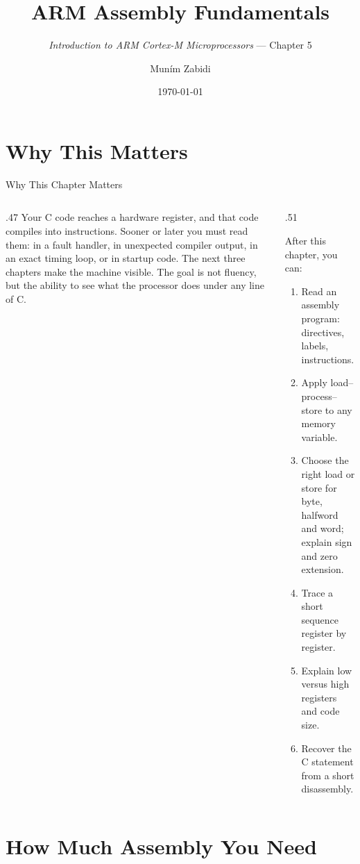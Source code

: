 \documentclass[9pt,aspectratio=169,xcolor=table]{beamer}
\title{ARM Assembly Fundamentals}
\subtitle{\emph{Introduction to ARM Cortex-M Microprocessors} --- Chapter 5}
\author{Mun\'{i}m Zabidi}
\institute{\color{primary}Faculty of Electrical Engineering, Universiti Teknologi Malaysia}
\date{\today}
\begin{document}
\titlepage

\section{Why This Matters}

\begin{frame}{Why This Chapter Matters}
    \begin{columns}[T]
    \begin{column}{.47\textwidth}
        {\normalsize Your C code reaches a hardware register, and that code compiles into instructions. Sooner or later you must read them: in a fault handler, in unexpected compiler output, in an exact timing loop, or in startup code. The next three chapters make the machine visible. The goal is not fluency, but the ability to see what the processor does under any line of C.}
    \end{column}
    \begin{column}{.51\textwidth}
        \begin{block}{After this chapter, you can:}
        {\small
        \begin{enumerate}\itemsep2pt
            \item Read an assembly program: directives, labels, instructions.
            \item Apply load--process--store to any memory variable.
            \item Choose the right load or store for byte, halfword and word; explain sign and zero extension.
            \item Trace a short sequence register by register.
            \item Explain low versus high registers and code size.
            \item Recover the C statement from a short disassembly.
        \end{enumerate}}
        \end{block}
    \end{column}
    \end{columns}
\end{frame}

\section{How Much Assembly You Need}
\end{document}
